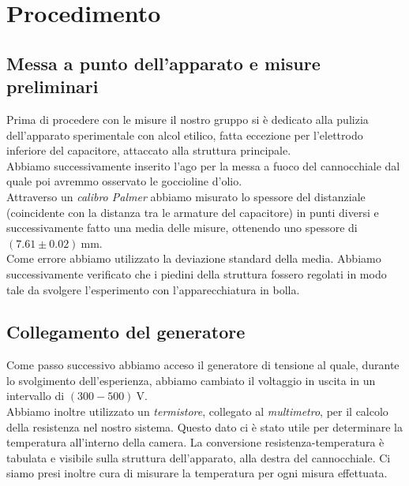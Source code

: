 \section{Procedimento}    
    \subsection{Messa a punto dell'apparato e misure preliminari}
        Prima di procedere con le misure il nostro gruppo si è dedicato alla pulizia dell'apparato sperimentale con alcol etilico, fatta eccezione per l'elettrodo inferiore del capacitore, attaccato alla struttura principale.\\
        Abbiamo successivamente inserito l'ago per la messa a fuoco del cannocchiale dal quale poi avremmo osservato le goccioline d'olio.\\
        Attraverso un \textit{calibro Palmer} abbiamo misurato lo spessore del distanziale (coincidente con la distanza tra le armature del capacitore) in punti diversi e successivamente fatto una media delle misure, ottenendo uno spessore di 
            $(7.61\pm0.02)~\mathrm{mm}$.\\
        Come errore abbiamo utilizzato la deviazione standard della media.
        Abbiamo successivamente verificato che i piedini della struttura fossero regolati in modo tale da svolgere l'esperimento con l'apparecchiatura in bolla.

        
    
    \subsection{Collegamento del generatore}
        Come passo successivo abbiamo acceso il generatore di tensione al quale, durante lo svolgimento dell'esperienza, abbiamo cambiato il voltaggio in uscita in un intervallo di
            $(300-500)~\mathrm{V}$.\\
        Abbiamo inoltre utilizzato un \textit{termistore}, collegato al \textit{multimetro}, per il calcolo della resistenza nel nostro sistema. Questo dato ci è stato utile per determinare la temperatura all'interno della camera. La conversione resistenza-temperatura è tabulata e visibile sulla struttura dell'apparato, alla destra del cannocchiale.
        Ci siamo presi inoltre cura di misurare la temperatura per ogni
        misura effettuata.
